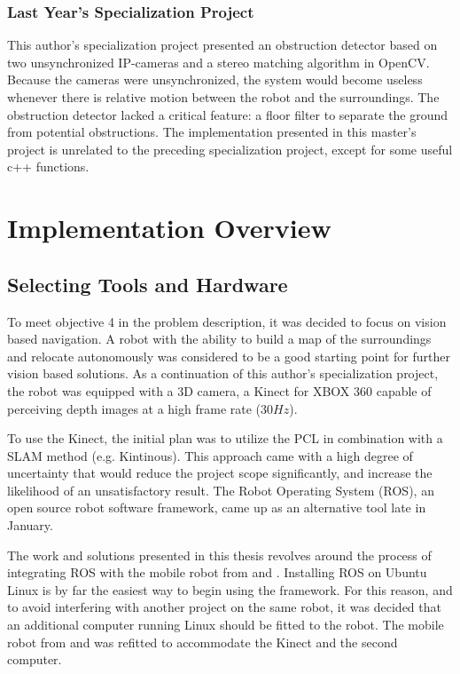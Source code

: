 \subsubsection{Last Year's Specialization Project}

This author's specialization project\cite{lindrup} presented an obstruction detector based on two unsynchronized IP-cameras and a stereo matching algorithm in \ac{OpenCV}. Because the cameras were unsynchronized, the system would become useless whenever there is relative motion between the robot and the surroundings. The obstruction detector lacked a critical feature: a floor filter to separate the ground from potential obstructions. The implementation presented in this master's project is unrelated to the preceding specialization project, except for some useful c++ functions.

\section{Implementation Overview}

\subsection{Selecting Tools and Hardware}

To meet objective 4 in the problem description, it was decided to focus on vision based navigation. A robot with the ability to build a map of the surroundings and relocate autonomously was considered to be a good starting point for further vision based solutions. As a continuation of this author's specialization project, the robot was equipped with a 3D camera, a Kinect for XBOX 360 capable of perceiving depth images at a high frame rate ($30 Hz$). 

To use the Kinect, the initial plan was to utilize the \ac{PCL} in combination with a \ac{SLAM} method (e.g. Kintinous\cite{Kintinous}). This approach came with a high degree of uncertainty that would reduce the project scope significantly, and increase the likelihood of an unsatisfactory result. The Robot Operating System (ROS), an open source robot software framework, came up as an alternative tool late in January. 

The work and solutions presented in this thesis revolves around the process of integrating ROS with the mobile robot from \cite{aspunvik} and \cite{berg}. Installing ROS on Ubuntu Linux is by far the easiest way to begin using the framework. For this reason, and to avoid interfering with another project on the same robot, it was decided that an additional computer running Linux should be fitted to the robot. The mobile robot from \cite{aspunvik} and \cite{berg} was refitted to accommodate the Kinect and the second computer.

